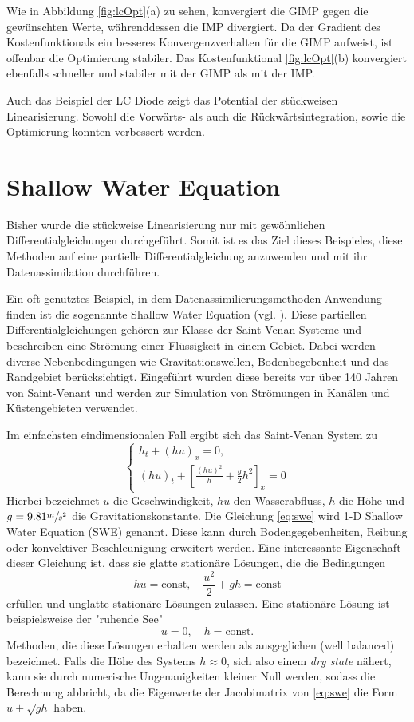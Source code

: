 Wie in Abbildung \ref{fig:lcOpt}(a) zu sehen, konvergiert die GIMP gegen die gewünschten Werte, währenddessen die IMP divergiert. Da der Gradient des Kostenfunktionals ein besseres Konvergenzverhalten für die GIMP aufweist, ist offenbar die Optimierung stabiler. Das Kostenfunktional \ref{fig:lcOpt}(b) konvergiert ebenfalls schneller und stabiler mit der GIMP als mit der IMP.

Auch das Beispiel der LC Diode zeigt das Potential der stückweisen Linearisierung. Sowohl die Vorwärts- als auch die Rückwärtsintegration, sowie die Optimierung konnten verbessert werden.
\section{Shallow Water Equation}
Bisher wurde die stückweise Linearisierung nur mit gewöhnlichen Differentialgleichungen durchgeführt. Somit ist es das Ziel dieses Beispieles, diese Methoden auf eine partielle Differentialgleichung anzuwenden und mit ihr Datenassimilation durchführen.

Ein oft genutztes Beispiel, in dem Datenassimilierungsmethoden Anwendung finden ist die sogenannte Shallow Water Equation (vgl. \cite{zou,navon}). 
Diese partiellen Differentialgleichungen gehören zur Klasse der Saint-Venan Systeme und beschreiben eine Strömung einer Flüssigkeit in einem Gebiet. Dabei werden diverse Nebenbedingungen wie Gravitationswellen, Bodenbegebenheit und das Randgebiet berücksichtigt. Eingeführt wurden diese bereits vor über 140 Jahren von Saint-Venant \cite{saint1871theorie} und werden zur Simulation von Strömungen in Kanälen und Küstengebieten verwendet.

Im einfachsten eindimensionalen Fall ergibt sich das Saint-Venan System zu 
\begin{equation}
\begin{cases}
 h_t + (hu)_x = 0,\\
 (hu)_t + \left[\frac{(hu)^2}{h} + \frac{g}{2}h^2\right]_x = 0
\end{cases} 
\label{eq:swe}
\end{equation}
Hierbei bezeichmet $u$ die Geschwindigkeit, $hu$ den Wasserabfluss, $h$ die Höhe und $g=9.81 \sfrac{m}{s^2}$ die Gravitationskonstante.
Die Gleichung \eqref{eq:swe} wird 1-D Shallow Water Equation (SWE) genannt.
Diese kann durch Bodengegebenheiten, Reibung oder konvektiver Beschleunigung erweitert werden.
Eine interessante Eigenschaft dieser Gleichung ist, dass sie glatte stationäre Lösungen, die die Bedingungen
\[
 hu = \text{const}, \quad \frac{u^2}{2}+gh = \text{const}
\]
erfüllen und unglatte stationäre Lösungen zulassen. Eine stationäre Lösung ist beispielsweise der "ruhende See"
\[
 u=0, \quad h=\text{const}.
\]
Methoden, die diese Lösungen erhalten werden als ausgeglichen (well balanced) bezeichnet. Falls die Höhe des Systems $h \approx 0 $, sich also einem \textit{dry state} nähert, kann sie durch numerische Ungenauigkeiten kleiner Null werden, sodass die Berechnung abbricht, da die Eigenwerte der Jacobimatrix von \eqref{eq:swe} die Form $u\pm \sqrt{gh}$ haben.


